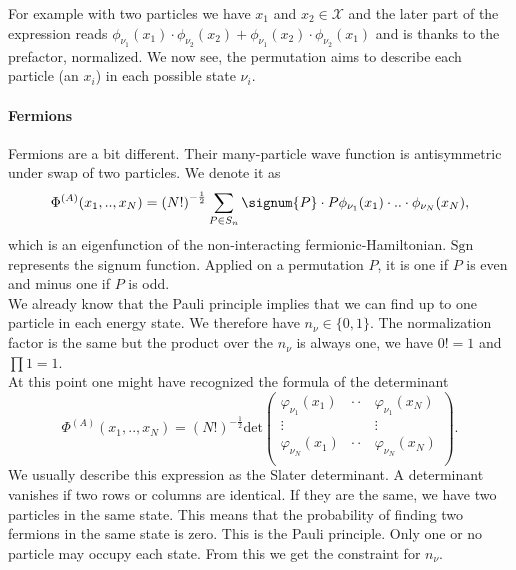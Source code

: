 \documentclass[../main.tex]{subfile}
\begin{document}
For example with two particles we have $x_1$ and $x_2\in\mathcal{X}$ and the later part of the expression reads 
$\phi_{\nu_1}(x_1) \cdot \phi_{\nu_2}(x_2) + \phi_{\nu_1}(x_2) \cdot \phi_{\nu_2}(x_1)$ and is thanks to the prefactor, normalized.
We now see, the permutation aims to describe each particle (an $x_i$) in each possible state $\nu_i$.

\paragraph{Fermions}$~$\\

Fermions are a bit different. Their many-particle wave function is antisymmetric under swap of two particles. We denote it as
\[
    \Phi^{(A)}(x_1,..,x_N) = \left(N!\right)^{-\frac{1}{2}} \sum_{P\in S_n} \signum{P}\cdot P \phi_{\nu_1}(x_1)\cdot ..\cdot \phi_{\nu_N}(x_N),
\]
which is an eigenfunction of the non-interacting fermionic-Hamiltonian.
$\text{Sgn}$ represents the signum function. Applied on a permutation $P$, it is one if $P$ is even and minus one if $P$ is odd.\\
We already know that the Pauli principle implies that we can find up to one particle in each energy state. We therefore have $n_\nu \in \{0,1\}$. The normalization
factor is the same but the product over the $n_{\nu}$ is always one, we have $0!=1$ and $\prod 1 = 1$.  \\

At this point one might have recognized the formula of the determinant
\[
    \Phi^{(A)}(x_1,..,x_N) = \left(N!\right)^{-\frac{1}{2}} \text{det}\begin{pmatrix}
        \varphi_{\nu_1}(x_1)& \cdot\cdot &\varphi_{\nu_1}(x_N)\\
        \vdots&  &\vdots\\
        \varphi_{\nu_N}(x_1)& \cdot\cdot &\varphi_{\nu_N}(x_N)\\

    \end{pmatrix}.
\]
We usually describe this expression as the Slater determinant. A determinant vanishes if two rows or columns are identical. If they are the same, we have two particles 
in the same state. This means that the probability of finding two fermions in the same state is zero.
This is the Pauli principle. Only one or no particle may occupy each state. From this we get the constraint for $n_{\nu}$.\\
\end{document}
